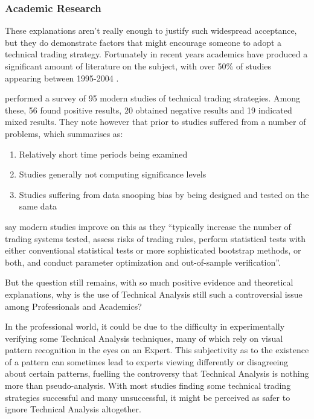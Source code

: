 \documentclass{article}
\begin{document}
\subsubsection{Academic Research}

These explanations aren't really enough to justify such widespread acceptance, but they do demonstrate factors that might encourage someone to adopt a technical trading strategy. Fortunately in recent years academics have produced a significant amount of literature on the subject, with over 50\% of studies appearing between 1995-2004 \citep{taprofitability}.

\cite{taprofitability} performed a survey of 95 modern studies of technical trading strategies. Among these, 56 found positive results, 20 obtained negative results and 19 indicated mixed results. They note however that prior to \cite{lukac1988} studies suffered from a number of problems, which \cite{brock1992} summarises as:
\begin{enumerate}
\item Relatively short time periods being examined 
\item Studies generally not computing significance levels 
\item Studies suffering from data snooping bias by being designed and tested on the same data
\end{enumerate}

\cite{taprofitability} say modern studies improve on this as they ``typically
increase the number of trading systems tested, assess risks of trading rules,
perform statistical tests with either conventional statistical tests or more sophisticated bootstrap methods, or both, and conduct parameter optimization and out-of-sample verification''.

But the question still remains, with so much positive evidence and theoretical explanations, why is the use of Technical Analysis still such a controversial issue among Professionals and Academics? 

In the professional world, it could be due to the difficulty in experimentally verifying some Technical Analysis techniques, many of which rely on visual pattern recognition in the eyes on an Expert. This subjectivity as to the existence of a pattern can sometimes lead to experts viewing differently or disagreeing about certain patterns, fuelling the controversy that Technical Analysis is nothing more than pseudo-analysis. With most studies finding some technical trading strategies successful and many unsuccessful, it might be perceived as safer to ignore Technical Analysis altogether.
\end{document}

